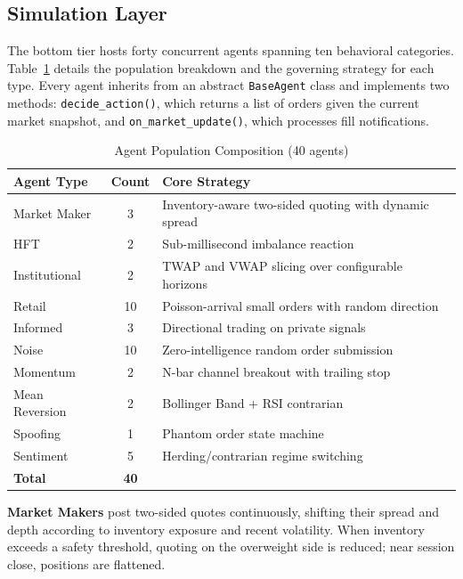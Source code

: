 \documentclass[conference]{IEEEtran}
\begin{document}
\subsection{Simulation Layer}

The bottom tier hosts forty concurrent agents spanning ten behavioral
categories. Table~\ref{tab:agents} details the population breakdown
and the governing strategy for each type. Every agent inherits from
an abstract \texttt{BaseAgent} class and implements two methods:
\texttt{decide\_action()}, which returns a list of orders given the
current market snapshot, and \texttt{on\_market\_update()}, which
processes fill notifications.

\begin{table}[htbp]
\caption{Agent Population Composition (40 agents)}
\label{tab:agents}
\centering
\renewcommand{\arraystretch}{1.2}
\begin{tabular}{lcp{3.2cm}}
\toprule
\textbf{Agent Type} & \textbf{Count} & \textbf{Core Strategy} \\
\midrule
Market Maker     & 3  & Inventory-aware two-sided quoting with dynamic spread \\
HFT              & 2  & Sub-millisecond imbalance reaction \\
Institutional    & 2  & TWAP and VWAP slicing over configurable horizons \\
Retail           & 10 & Poisson-arrival small orders with random direction \\
Informed         & 3  & Directional trading on private signals \\
Noise            & 10 & Zero-intelligence random order submission \\
Momentum         & 2  & N-bar channel breakout with trailing stop \\
Mean Reversion   & 2  & Bollinger Band + RSI contrarian \\
Spoofing         & 1  & Phantom order state machine \\
Sentiment        & 5  & Herding/contrarian regime switching \\
\midrule
\textbf{Total}   & \textbf{40} & \\
\bottomrule
\end{tabular}
\end{table}

\textbf{Market Makers} post two-sided quotes continuously, shifting
their spread and depth according to inventory exposure and recent
volatility. When inventory exceeds a safety threshold, quoting on the
overweight side is reduced; near session close, positions are
flattened.
\end{document}
